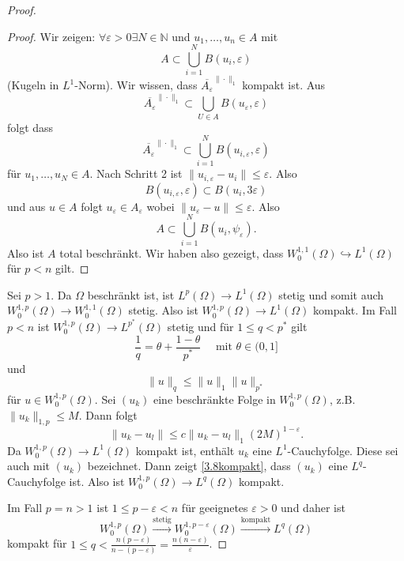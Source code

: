 \documentclass[
paper=a4,
bibtotocnumbered,
liststotocnumbered,
tablecaptionabove,
pointlessnumbers,
twoside,
openright,
10pt
]
{report}
\theoremstyle{definition}
\numberwithin{equation}{chapter}
\begin{document}
\begin{proof}
\begin{proof}
Wir zeigen: $\forall \varepsilon >0 \exists N \in \mathbb N$ und $u_1, \ldots, u_n \in A$ mit
\begin{equation}
 A \subset \bigcup_{i=1}^N B(u_i, \varepsilon)
\end{equation}
(Kugeln in $L^1$-Norm). Wir wissen, dass $\overline{A_\varepsilon}^{\|\cdot \|_1}$ kompakt ist. Aus
\begin{equation}
 \overline{A_\varepsilon}^{\|\cdot\|_1} \subset\bigcup_{U\in A} B(u_\varepsilon, \varepsilon)
\end{equation}
folgt dass
\begin{equation}
 \overline{A_\varepsilon}^{\|\cdot \|_1} \subset \bigcup_{i=1}^N B(u_{i,\varepsilon}, \varepsilon)
\end{equation}
für $u_1,\ldots, u_N \in A$. Nach Schritt 2 ist $\| u_{i,\varepsilon} - u_i \| \le \varepsilon$. Also
\begin{equation}
 B(u_{i,\varepsilon}, \varepsilon) \subset B(u_i, 3\varepsilon)
\end{equation}
und aus $u\in A$ folgt $u_\varepsilon \in A_\varepsilon$ wobei $\| u_\varepsilon - u\| \le \varepsilon$. Also
\begin{equation}
 A\subset \bigcup_{i=1}^N B(u_i, \psi_\varepsilon).
\end{equation}
Also ist $A$ total beschränkt. Wir haben also gezeigt, dass $W_0^{1,1}(\Omega) \hookrightarrow L^1(\Omega)$ für $p<n$ gilt.
\end{proof}
Sei $p>1$.  Da $\Omega$ beschränkt ist, ist $L^p(\Omega)\to L^1(\Omega)$ stetig und somit auch 
$W_0^{1,p}(\Omega) \to W_0^{1,1}(\Omega)$ stetig. Also ist $W_0^{1,p}(\Omega) \to L^{1}(\Omega)$ kompakt. Im Fall $p<n$ ist $W_0^{1,p}(\Omega) \to L^{p^*}(\Omega)$ stetig und für $1\le q<p^*$ gilt
\begin{equation}
 \frac{1}{q} = \theta + \frac{1-\theta}{p^*} \quad \text{ mit } \theta\in (0,1]
\end{equation}
und 
\begin{equation}
 \| u\|_q \le \|u\|_1 \| u\|_{p^*}
\end{equation}
für $u\in W_0^{1,p}(\Omega)$.  Sei $(u_k)$ eine beschränkte Folge in $W_0^{1,p}(\Omega)$, z.B. $\|u_k\|_{1,p}\le M$. Dann folgt
\begin{equation}\label{3.8kompakt}
 \|u_k - u_l\| \le c \|u_k - u_l\|_1 (2M)^{1-\varepsilon}.
\end{equation}
Da $W_0^{1,p}(\Omega) \to L^1(\Omega)$ kompakt ist, enthält $u_k$ eine $L^1$-Cauchyfolge. Diese sei auch mit $(u_k)$ bezeichnet. Dann zeigt \eqref{3.8kompakt}, dass $(u_k)$ eine $L^q$-Cauchyfolge ist. Also ist $W_0^{1,p}(\Omega) \to L^q(\Omega)$ kompakt.

Im Fall $p=n>1$ ist $1\le p - \varepsilon <n$ für geeignetes $\varepsilon>0$ und daher ist 
\begin{equation}
 W_0^{1,p}(\Omega) \stackrel{\text{stetig}}{\to} W_0^{1,p-\varepsilon}(\Omega) \stackrel{\text{kompakt}}{\to} L^q(\Omega)
\end{equation}
kompakt für $1\le q < \frac{n(p-\varepsilon)}{n-(p-\varepsilon)} = \frac{n(n-\varepsilon)}{\varepsilon}$.
\end{proof}
\end{document}
